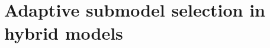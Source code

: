 


\chapter[ADAPTIVE SUBMODEL SELECTION INB HYBRID MODELS]{Adaptive submodel selection in hybrid  models}\label{adaptiveselection}
  

